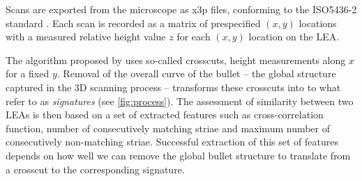 \documentclass[12pt]{article}
\begin{document}
Scans are exported from the microscope as x3p files, conforming to the
ISO5436-2 standard \citep{ISO5436}. Each scan is recorded as a matrix of
prespecified \((x,y)\) locations with a measured relative height value
\(z\) for each \((x,y)\) location on the LEA.

The algorithm proposed by \citet{Hare1} uses so-called crosscuts, height
measurements along \(x\) for a fixed \(y\). Removal of the overall curve
of the bullet -- the global structure captured in the 3D scanning
process -- transforms these crosscuts into to what \citet{Hare1} refer
to as \emph{signatures} (see \autoref{fig:process}). The assessment of
similarity between two LEAs is then based on a set of extracted features
such as cross-correlation function, number of consecutively matching
striae \citep[see][]{Biasotti} and maximum number of consecutively
non-matching striae. Successful extraction of this set of features
depends on how well we can remove the global bullet structure to
translate from a crosscut to the corresponding signature.
\end{document}
